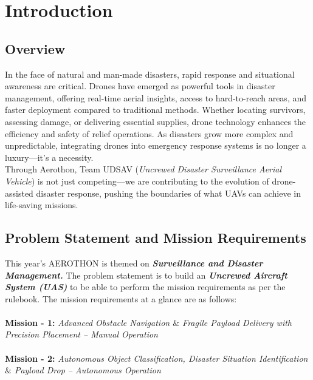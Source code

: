 \documentclass[12pt]{report}
\begin{document}
  \tableofcontents
  \newpage

  \renewcommand{\arraystretch}{1.5}

  \chapter{Introduction}
  \section{Overview}

   In the face of natural and man-made disasters, rapid response and situational awareness are critical. Drones have emerged as powerful tools in disaster management, offering real-time aerial insights, access to hard-to-reach areas, and faster deployment compared to traditional methods. Whether locating survivors, assessing damage, or delivering essential supplies, drone technology enhances the efficiency and safety of relief operations. As disasters grow more complex and unpredictable, integrating drones into emergency response systems is no longer a luxury—it's a necessity. \\ 

   Through Aerothon, Team UDSAV (\textit{Uncrewed Disaster Surveillance Aerial Vehicle}) is not just competing—we are contributing to the evolution of drone-assisted disaster response, pushing the boundaries of what UAVs can achieve in life-saving missions.

    \section{Problem Statement and Mission Requirements}
    This year's AEROTHON is themed on \textbf{\textit{Surveillance and Disaster Management.}} The problem statement is to build an \textbf{\textit{Uncrewed Aircraft System (UAS)}} to be able to perform the mission requirements as per the rulebook. The mission requirements at a glance are as follows: \\ \\
    \textbf{Mission - 1:} \textit{Advanced Obstacle Navigation $\&$ Fragile Payload Delivery with Precision Placement – Manual Operation} \\ \\
    \textbf{Mission - 2:} \textit{Autonomous Object Classification, Disaster Situation Identification $\&$ Payload Drop – Autonomous Operation} 
\end{document}
